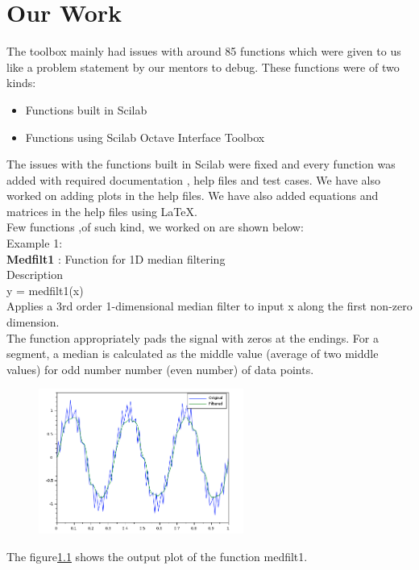 \documentclass[12pt,a4paper]{report}
\begin{document}
\chapter{\textbf{Our Work}}
                   
The toolbox mainly had issues with around 85 functions which were given to us like a problem statement by our mentors to debug. These functions were of two kinds:\\


\begin{itemize}
\item Functions built in Scilab
\item Functions using Scilab Octave Interface Toolbox\\
\end{itemize}

The issues with the functions built in Scilab were fixed and every function was added with required documentation , help files and test cases. We have also worked on adding plots in the help files. We have also added equations and matrices in the help files using LaTeX.\\
Few functions ,of such kind, we worked on are shown below:\\
Example 1:\\
\textbf{Medfilt1} : Function for 1D median filtering\\
Description\\
y = medfilt1(x)\\
Applies a 3rd order 1-dimensional median filter to input x along the first non-zero dimension.\\
The function appropriately pads the signal with zeros at the endings. For a segment, a median is calculated as the middle value (average of two middle values) for odd number number (even number) of data points.\\
\begin{figure}[H]
\centering
\includegraphics[width = 0.6\textwidth]{medfilt1.png}
\label{medfilt1}
\end{figure}
The figure\ref{medfilt1} shows the output plot of the  function medfilt1.
\end{document}
